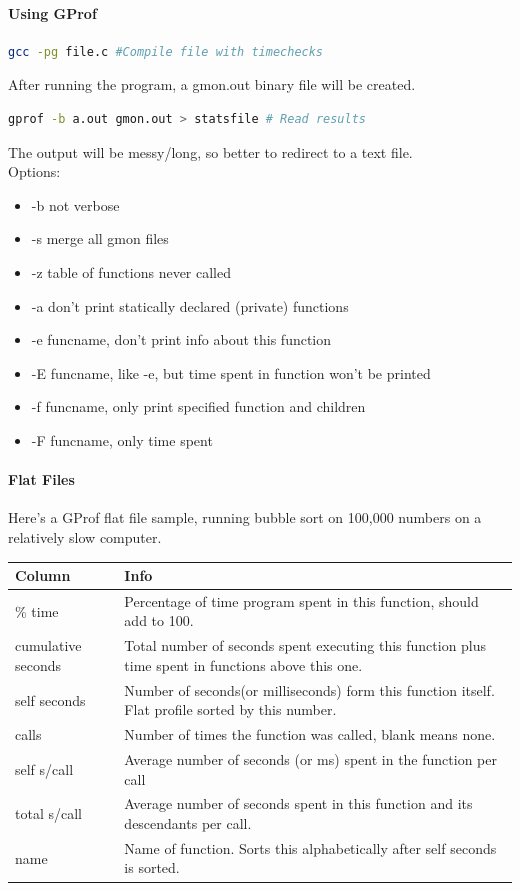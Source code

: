 \documentclass[12 pt]{article}
\begin{document}
\paragraph{Using GProf}
\begin{lstlisting}[language=bash]
gcc -pg file.c #Compile file with timechecks
\end{lstlisting}
After running the program, a gmon.out binary file will be created.
\begin{lstlisting}[language=bash]
gprof -b a.out gmon.out > statsfile # Read results
\end{lstlisting}
The output will be messy/long, so better to redirect to a text file.
\\ Options:
\begin{itemize}
\item -b not verbose
\item -s merge all gmon files
\item -z table of functions never called
\item -a don't print statically declared (private) functions
\item -e funcname, don't print info about this function
\item -E funcname, like -e, but time spent in function won't be printed
\item -f funcname, only print specified function and children
\item -F funcname, only time spent
\end{itemize}
\paragraph{Flat Files} Here's a GProf flat file sample, running bubble sort on 100,000 numbers on a relatively slow computer.

\begin{tabularx}{1.0\linewidth}{|X|X|}
 \hline \textbf{Column}&\textbf{Info}
  \\ \hline \% time & Percentage of time program spent in this function, should add to 100.
  \\ \hline cumulative seconds & Total number of seconds spent executing this function plus time spent in functions above this one.
  \\ \hline self seconds & Number of seconds(or milliseconds) form this function itself. Flat profile sorted by this number.
  \\ \hline calls & Number of times the function was called, blank means none.
  \\ \hline self s/call & Average number of seconds (or ms) spent in the function per call
  \\ \hline total s/call & Average number of seconds spent in this function and its descendants per call.
  \\ \hline name & Name of function. Sorts this alphabetically after self seconds is sorted.
  \\ \hline
\end{tabularx}
\end{document}
